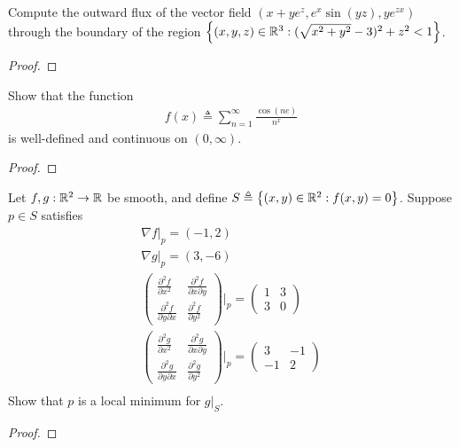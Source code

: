 \documentclass{report}
\begin{document}
\begin{question}{}{}
Compute the outward flux of the vector field $(x+ye^z,e^x \sin (yz),ye^{zx})$ through the boundary of the region $\left\{ (x,y,z)\in\mathbb{R}^3: (\sqrt{x^2+y^2}-3 )^2+z^2<1 \right\}$. 
\end{question}
\begin{proof}

\end{proof}
\begin{question}{}{}
Show that the function 
\begin{align*}
f(x)\triangleq \sum_{n=1}^{\infty}  \frac{\cos (ne)}{n^x}
\end{align*}
is well-defined and continuous on $(0,\infty)$. 
\end{question}
\begin{proof}

\end{proof}
\begin{question}{}{}
Let $f,g:\mathbb{R}^2 \rightarrow \mathbb{R}$ be smooth, and define $S\triangleq \left\{ (x,y)\in\mathbb{R}^2: f(x,y)=0 \right\}$. Suppose $p \in S$ satisfies 
\begin{align*}
\nabla f|_p= (-1,2)\\
\nabla g |_p = (3,-6) \\
\begin{pmatrix} 
  \frac{\partial ^2 f}{\partial x^2} & \frac{\partial ^2 f}{\partial x \partial y} \\
  \frac{\partial ^2 f}{\partial y \partial x} & \frac{\partial ^2 f}{\partial y^2}
\end{pmatrix} \Bigg|_p = \begin{pmatrix} 
 1 & 3 \\
 3 & 0
\end{pmatrix}  \\
\begin{pmatrix} 
  \frac{\partial ^2 g}{\partial x^2} & \frac{\partial ^2 g}{\partial x \partial y} \\
  \frac{\partial ^2 g}{\partial y \partial x} & \frac{\partial ^2 g}{\partial y^2}
\end{pmatrix} \Bigg|_p = \begin{pmatrix} 
 3 & -1 \\
 -1 & 2
\end{pmatrix}  \\
\end{align*}
Show that $p$ is a local minimum for  $g|_S$. 
\end{question}
\begin{proof}

\end{proof}
\end{document}
